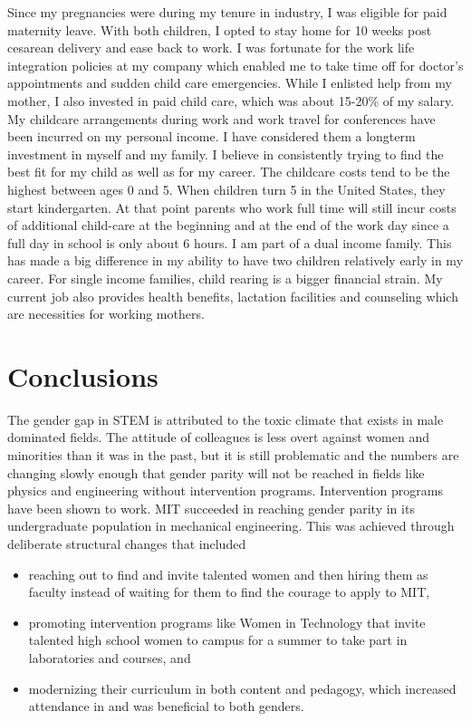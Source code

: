 \documentclass[utf8]{frontiersSCNS} %
\begin{document}
Since my pregnancies were during my tenure in industry, I was eligible for paid maternity leave. With both children, I opted to stay home for 10 weeks post cesarean delivery and ease back to work. I was fortunate for the work life integration policies at my company which enabled me to take time off for doctor’s appointments and sudden child care emergencies. While I enlisted help from my mother, I also invested in paid child care, which was about 15-20\% of my salary. My childcare arrangements during work and work travel for conferences have been incurred on my personal income. I have considered them a longterm investment in myself and my family. I believe in consistently trying to find the best fit for my child as well as for my career.  The childcare costs tend to be the highest between ages 0 and 5. When children turn 5 in the United States, they start kindergarten. At that point parents who work full time will still incur costs of additional child-care at the beginning and at the end of the work day since a full day in school is only about 6 hours.  I am part of a dual income family. This has made a big difference in my ability to have two children relatively early in my career. For single income families, child rearing is a bigger financial strain. My current job also provides health benefits, lactation facilities and counseling which are necessities for working mothers.
\section{Conclusions}
The gender gap in STEM is attributed to the toxic climate that exists in male dominated fields. The attitude of colleagues is less overt against women and minorities than it was in the past, but it is still problematic and the numbers are changing slowly enough that gender parity will not be reached in fields like physics and engineering without intervention programs. Intervention programs have been shown to work. MIT succeeded in reaching gender parity in its undergraduate population in mechanical engineering. This was achieved through deliberate structural changes that included 
\begin{itemize}
\item reaching out to find and invite talented women and then hiring them as faculty instead of waiting for them to find the courage to apply to MIT, 
\item promoting intervention programs like Women in Technology that invite talented high school women to campus for a summer to take part in laboratories and courses, and 
\item modernizing their curriculum in both content and pedagogy, which increased attendance in and was beneficial to both genders.
\end{itemize}
\end{document}
